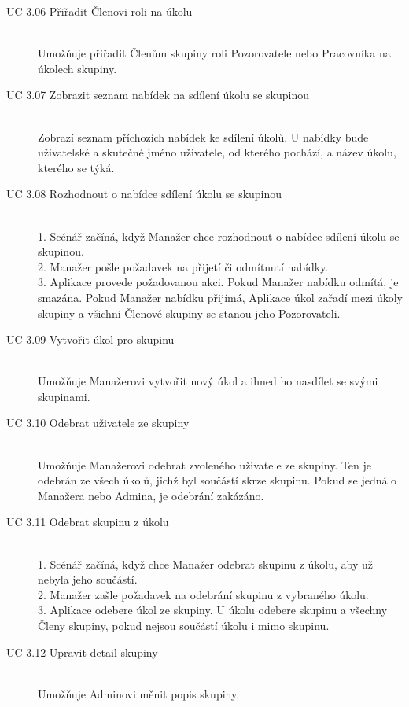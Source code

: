 \documentclass[thesis=B,czech]{FITthesis}[2012/06/26]
\begin{document}
\begin{description}
				\item[UC 3.06 Přiřadit Členovi roli na úkolu] \hfill \\
					Umožňuje přiřadit Členům skupiny roli Pozorovatele nebo Pracovníka na úkolech skupiny.
					
				\item[UC 3.07 Zobrazit seznam nabídek na sdílení úkolu se skupinou] \hfill \\
					Zobrazí seznam příchozích nabídek ke sdílení úkolů. U nabídky bude uživatelské a skutečné jméno uživatele, od kterého pochází, a název úkolu, kterého se týká.
					
				\item[UC 3.08 Rozhodnout o nabídce sdílení úkolu se skupinou] \hfill \\
					1. Scénář začíná, když Manažer chce rozhodnout o nabídce sdílení úkolu se skupinou. \\
					2. Manažer pošle požadavek na přijetí či odmítnutí nabídky. \\
					3. Aplikace provede požadovanou akci. Pokud Manažer nabídku odmítá, je smazána. Pokud Manažer nabídku přijímá, Aplikace úkol zařadí mezi úkoly skupiny a všichni Členové skupiny se stanou jeho Pozorovateli.
				
				\item[UC 3.09 Vytvořit úkol pro skupinu] \hfill \\
					Umožňuje Manažerovi vytvořit nový úkol a ihned ho nasdílet se svými skupinami.
				
				\item[UC 3.10 Odebrat uživatele ze skupiny] \hfill \\
					Umožňuje Manažerovi odebrat zvoleného uživatele ze skupiny. Ten je odebrán ze všech úkolů, jichž byl součástí skrze skupinu. Pokud se jedná o Manažera nebo Admina, je odebrání zakázáno. 
				
				\item[UC 3.11 Odebrat skupinu z úkolu] \hfill \\
					1. Scénář začíná, když chce Manažer odebrat skupinu z úkolu, aby už nebyla jeho součástí. \\
					2. Manažer zašle požadavek na odebrání skupinu z vybraného úkolu. \\
					3. Aplikace odebere úkol ze skupiny. U úkolu odebere skupinu a všechny Členy skupiny, pokud nejsou součástí úkolu i mimo skupinu. \\
					
				\item[UC 3.12 Upravit detail skupiny] \hfill \\
					Umožňuje Adminovi měnit popis skupiny.
				

\end{description}
\end{document}
